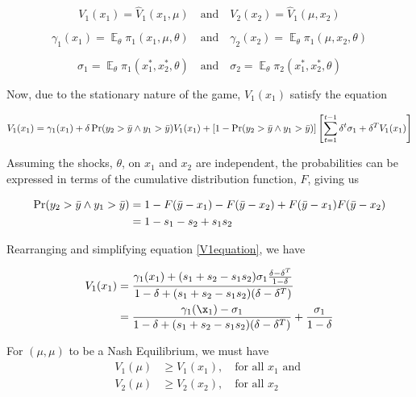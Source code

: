 \documentclass{article}
\begin{document}
\begin{equation*}
V_1(x_1) = \hat{V}_1(x_1,\mu) \quad\text{and}\quad V_2(x_2) = \hat{V}_1(\mu,x_2)
\end{equation*}

\begin{equation*}
\gamma_1(x_1) = \mathop{\mathbb{E}}_\theta \pi_1(x_1,\mu,\theta) \quad\text{and}\quad 
\gamma_2(x_2) = \mathop{\mathbb{E}}_\theta \pi_1(\mu,x_2,\theta)
\end{equation*}

\begin{equation*}
\sigma_1 = \mathop{\mathbb{E}}_\theta \pi_1(x_1^*,x_2^*,\theta) \quad\text{and}\quad 
\sigma_2 = \mathop{\mathbb{E}}_\theta \pi_2(x_1^*,x_2^*,\theta)
\end{equation*}

Now, due to the stationary nature of the game, $V_1(x_1)$ satisfy the equation

\begin{equation}
V_1(x_1) = \gamma_1(x_1) + \delta \Pr(y_2>\Bar{y} \land y_1>\Bar{y})V_1(x_1) + [1-\Pr(y_2>\Bar{y} \land y_1>\Bar{y})]\left[\sum_{t=1}^{t-1} \delta^t \sigma_1+\delta^T V_1(x_1)\right]
\label{V1equation}
\end{equation}

Assuming the shocks, $\theta$, on $x_1$ and $x_2$ are independent, the probabilities can be expressed in terms of the cumulative distribution function, $F$, giving us

\begin{align*}
\Pr(y_2>\Bar{y} \land y_1>\Bar{y}) &= 1 - F(\Bar{y} - x_1) - F(\bar{y} - x_2) + F(\bar{y}-x_1)F(\bar{y}-x_2)\\
&= 1-s_1-s_2+s_1s_2
\end{align*}

Rearranging and simplifying equation \ref{V1equation}, we have 

\begin{align*}
V_1(x_1) &= \frac{\gamma_1(x_1) + (s_1+s_2-s_1s_2)\sigma_1 \frac{\delta - \delta^T}{1-\delta}}{1-\delta+(s_1+s_2-s_1s_2)(\delta-\delta^T)}\\
&= \frac{\gamma_1(\x_1) - \sigma_1}{1-\delta +(s_1+s_2-s_1s_2)(\delta-\delta^T)} + \frac{\sigma_1}{1-\delta}
\end{align*}

For $(\mu,\mu)$ to be a Nash Equilibrium, we must have 
\begin{align*}
V_1(\mu) &\geq V_1(x_1), \quad\text{for all } x_1 \text{ and }\\
V_2(\mu) &\geq V_2(x_2), \quad\text{for all } x_2
\end{align*}
\end{document}
